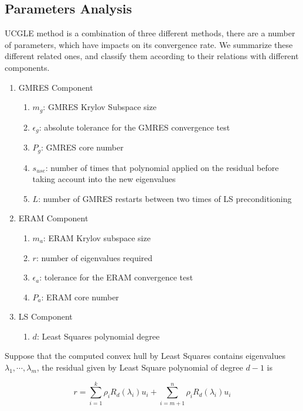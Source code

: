 \subsection{Parameters Analysis} \label{workflow}

UCGLE method is a combination of three different methods, there are a number of parameters, which have impacts on its convergence rate. We summarize these different related ones, and classify them according to their relations with different components.

\begin{enumerate}[]
	\item GMRES Component
	\begin{enumerate}[]
		\item $m_g$: GMRES Krylov Subspace size 
		\item $\epsilon_g$: absolute tolerance for  the GMRES convergence test
		\item $P_g$: GMRES core number
		\item $s_{use}$: number of times that polynomial applied on the residual before taking account into the new eigenvalues
		\item $L$: number of GMRES restarts between two times of LS preconditioning
	\end{enumerate}
	\item ERAM Component
	\begin{enumerate}[]
		\item $m_a$: ERAM Krylov subspace size
		\item $r$: number of eigenvalues required
		\item $\epsilon_a$: tolerance for the ERAM convergence test
		\item $P_a$: ERAM core number
	\end{enumerate}
	\item LS Component
	\begin{enumerate}[]
		\item $d$: Least Squares polynomial degree
	\end{enumerate}
\end{enumerate}

Suppose that the computed convex hull by Least Squares contains eigenvalues $\lambda_1,\cdots, \lambda_m$, the residual given by Least Square polynomial of degree $d-1$ is

\[
r = \sum_{i=1}^{k}\rho_i R_d(\lambda_i)u_i + \sum_{i=m+1}^{n}\rho_i R_d(\lambda_i)u_i
\]

